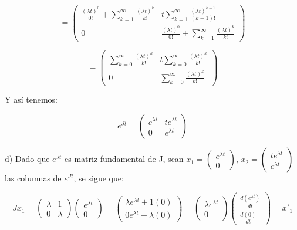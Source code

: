 $$= \begin{pmatrix}
\frac{(\lambda t)^0}{0!} + \displaystyle \sum_{k=1}^{\infty} \frac{(\lambda t)^k}{k!} & t \displaystyle \sum_{k=1}^{\infty} \frac{(\lambda t)^{k-1}}{(k-1)!}\\
0 & \frac{(\lambda t)^0}{0!} + \displaystyle \sum_{k=1}^{\infty} \frac{(\lambda t)^k}{k!}
\end{pmatrix}$$

$$=\begin{pmatrix}
\displaystyle \sum_{k=0}^{\infty} \frac{(\lambda t)^k}{k!} & t \displaystyle \sum_{k=0}^{\infty} \frac{(\lambda t)^k}{k!} \\
0 & \displaystyle \sum_{k=0}^{\infty} \frac{(\lambda t)^k}{k!}
\end{pmatrix}$$

Y así tenemos: 

$$e^{Jt}= \begin{pmatrix}
e^{\lambda t} & t e^{\lambda t}\\
0 & e^{\lambda t}
\end{pmatrix}$$

d) Dado que $e^{Jt}$ es matriz fundamental de J, sean $x_1= \begin{pmatrix}
e^{\lambda t}\\
0
\end{pmatrix}$,
$x_2= \begin{pmatrix}
t e^{\lambda t}\\
e^{\lambda t}
\end{pmatrix}$
las columnas de $e^{Jt}$, se sigue que: 

$$J x_1= \begin{pmatrix}
\lambda & 1\\
0 & \lambda
\end{pmatrix}
\begin{pmatrix}
e^{\lambda t}\\
0
\end{pmatrix}=
\begin{pmatrix}
\lambda e^{\lambda t} +1(0)\\
0 e^{\lambda t} + \lambda(0)
\end{pmatrix}=
\begin{pmatrix}
\lambda e^{\lambda t}\\
0
\end{pmatrix}
\begin{pmatrix}
\frac{d(e^{\lambda t})}{dt}\\
\frac{d(0)}{dt}
\end{pmatrix}= x'_1$$

